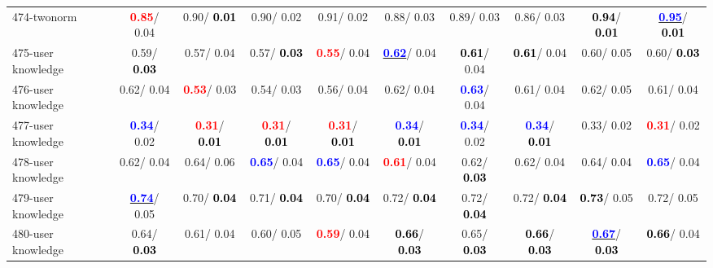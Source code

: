 \begin{table}[h]
\begin{center}
{\begin{tabular}{lc|c|c|c|c|c|c|c|c}
474-twonorm & \textcolor{red}{\textbf{  0.85}}/  0.04 &   0.90/\textcolor{black}{\textbf{  0.01}} &   0.90/  0.02 &   0.91/  0.02 &   0.88/  0.03 &   0.89/  0.03 &   0.86/  0.03 & \textcolor{black}{\textbf{  0.94}}/\textcolor{black}{\textbf{  0.01}} & \underline{\textcolor{blue}{\textbf{  0.95}}}/\textcolor{black}{\textbf{  0.01}} \\
475-user knowledge &   0.59/\textcolor{black}{\textbf{  0.03}} &   0.57/  0.04 &   0.57/\textcolor{black}{\textbf{  0.03}} & \textcolor{red}{\textbf{  0.55}}/  0.04 & \underline{\textcolor{blue}{\textbf{  0.62}}}/  0.04 & \textcolor{black}{\textbf{  0.61}}/  0.04 & \textcolor{black}{\textbf{  0.61}}/  0.04 &   0.60/  0.05 &   0.60/\textcolor{black}{\textbf{  0.03}} \\
476-user knowledge &   0.62/  0.04 & \textcolor{red}{\textbf{  0.53}}/  0.03 &   0.54/  0.03 &   0.56/  0.04 &   0.62/  0.04 & \textcolor{blue}{\textbf{  0.63}}/  0.04 &   0.61/  0.04 &   0.62/  0.05 &   0.61/  0.04 \\ \hline
477-user knowledge & \textcolor{blue}{\textbf{  0.34}}/  0.02 & \textcolor{red}{\textbf{  0.31}}/\textcolor{black}{\textbf{  0.01}} & \textcolor{red}{\textbf{  0.31}}/\textcolor{black}{\textbf{  0.01}} & \textcolor{red}{\textbf{  0.31}}/\textcolor{black}{\textbf{  0.01}} & \textcolor{blue}{\textbf{  0.34}}/\textcolor{black}{\textbf{  0.01}} & \textcolor{blue}{\textbf{  0.34}}/  0.02 & \textcolor{blue}{\textbf{  0.34}}/\textcolor{black}{\textbf{  0.01}} &   0.33/  0.02 & \textcolor{red}{\textbf{  0.31}}/  0.02 \\
478-user knowledge &   0.62/  0.04 &   0.64/  0.06 & \textcolor{blue}{\textbf{  0.65}}/  0.04 & \textcolor{blue}{\textbf{  0.65}}/  0.04 & \textcolor{red}{\textbf{  0.61}}/  0.04 &   0.62/\textcolor{black}{\textbf{  0.03}} &   0.62/  0.04 &   0.64/  0.04 & \textcolor{blue}{\textbf{  0.65}}/  0.04 \\
479-user knowledge & \underline{\textcolor{blue}{\textbf{  0.74}}}/  0.05 &   0.70/\textcolor{black}{\textbf{  0.04}} &   0.71/\textcolor{black}{\textbf{  0.04}} &   0.70/\textcolor{black}{\textbf{  0.04}} &   0.72/\textcolor{black}{\textbf{  0.04}} &   0.72/\textcolor{black}{\textbf{  0.04}} &   0.72/\textcolor{black}{\textbf{  0.04}} & \textcolor{black}{\textbf{  0.73}}/  0.05 &   0.72/  0.05 \\
480-user knowledge &   0.64/\textcolor{black}{\textbf{  0.03}} &   0.61/  0.04 &   0.60/  0.05 & \textcolor{red}{\textbf{  0.59}}/  0.04 & \textcolor{black}{\textbf{  0.66}}/\textcolor{black}{\textbf{  0.03}} &   0.65/\textcolor{black}{\textbf{  0.03}} & \textcolor{black}{\textbf{  0.66}}/\textcolor{black}{\textbf{  0.03}} & \underline{\textcolor{blue}{\textbf{  0.67}}}/\textcolor{black}{\textbf{  0.03}} & \textcolor{black}{\textbf{  0.66}}/  0.04 \\\end{tabular}}\label{stratsALCKappa14Allallb}
\end{center}
\end{table}
